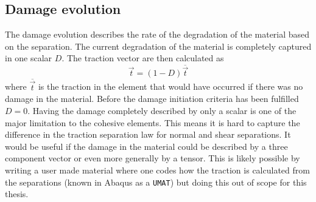 \documentclass[grain_boundary_law.tex]{subfiles}
\begin{document}
\subsection{Damage evolution}

The damage evolution describes the rate of the degradation of the material based on the separation. The current degradation of the material is completely captured in one scalar $D$. The traction vector are then calculated as 
%
\[ \vec{t} = (1 - D) \overline{\vec{t}} \]
%
 where $\overline{\vec{t}}$ is the traction in the element that would have occurred if there was no damage in the material. Before the damage initiation criteria has been fulfilled $D = 0$. Having the damage completely described by only a scalar is one of the major limitation to the cohesive elements. This means it is hard to capture the difference in the traction separation law for normal and shear separations. It would be useful if the damage in the material could be described by a three component vector or even more generally by a tensor. This is likely possible by writing a user made material where one codes how the traction is calculated from the separations (known in Abaqus as a \texttt{UMAT}) but doing this out of scope for this thesis.
\end{document}

